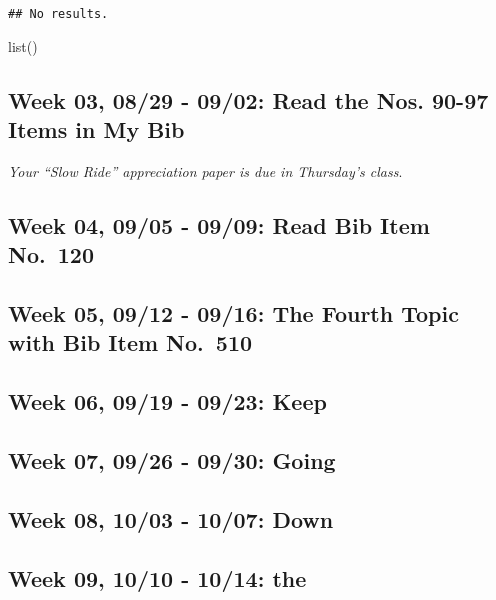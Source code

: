 \documentclass[11pt,]{article}
\begin{document}
\begin{verbatim}
## No results.
\end{verbatim}

list()

\hypertarget{week-03-0829---0902-read-the-nos.-90-97-items-in-my-bib}{%
\subsection{Week 03, 08/29 - 09/02: Read the Nos. 90-97 Items in My Bib}\label{week-03-0829---0902-read-the-nos.-90-97-items-in-my-bib}}

\emph{Your ``Slow Ride'' appreciation paper is due in Thursday's class}.

\hypertarget{week-04-0905---0909-read-bib-item-no.-120}{%
\subsection{Week 04, 09/05 - 09/09: Read Bib Item No.~120}\label{week-04-0905---0909-read-bib-item-no.-120}}

\hypertarget{week-05-0912---0916-the-fourth-topic-with-bib-item-no.-510}{%
\subsection{Week 05, 09/12 - 09/16: The Fourth Topic with Bib Item No.~510}\label{week-05-0912---0916-the-fourth-topic-with-bib-item-no.-510}}

\hypertarget{week-06-0919---0923-keep}{%
\subsection{Week 06, 09/19 - 09/23: Keep}\label{week-06-0919---0923-keep}}

\hypertarget{week-07-0926---0930-going}{%
\subsection{Week 07, 09/26 - 09/30: Going}\label{week-07-0926---0930-going}}

\hypertarget{week-08-1003---1007-down}{%
\subsection{Week 08, 10/03 - 10/07: Down}\label{week-08-1003---1007-down}}

\hypertarget{week-09-1010---1014-the}{%
\subsection{Week 09, 10/10 - 10/14: the}\label{week-09-1010---1014-the}}
\end{document}
